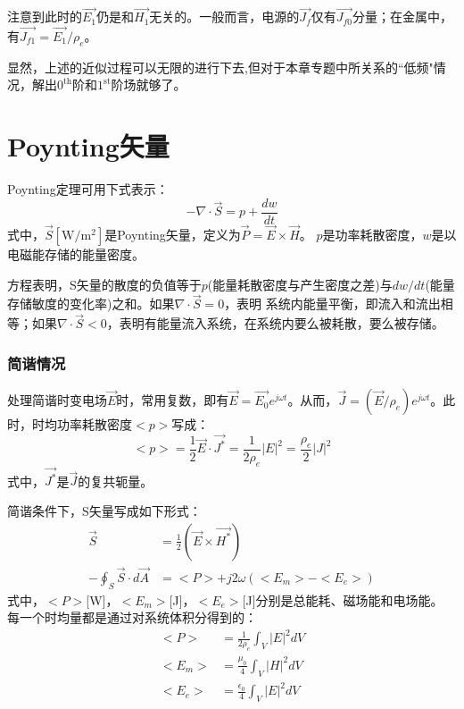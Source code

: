 注意到此时的$\vec{E_1}$仍是和$\vec{H_1}$无关的。一般而言，电源的$\vec{J_f}$仅有$\vec{J_{f0}}$分量；在金属中，有$\vec{J_{f1}}=\vec{E_1}/\rho_e$。

显然，上述的近似过程可以无限的进行下去,但对于本章专题中所关系的``低频"情况，解出$\mathrm{0^{th}}$阶和$\mathrm{1^{st}}$阶场就够了。

\section{Poynting矢量}
Poynting定理可用下式表示：
\begin{equation}\label{eqn:poynting}
-\nabla\cdot \vec{S}=p+\frac{dw}{dt}
\end{equation}
式中，$\vec{S}[\mathrm{W/m^2}]$是Poynting矢量，定义为$\vec{P}=\vec{E}\times \vec{H}$。
$p$是功率耗散密度，$w$是以电磁能存储的能量密度。

方程表明，S矢量的散度的负值等于$p$(能量耗散密度与产生密度之差)与$dw/dt$(能量存储敏度的变化率)之和。如果$\nabla \cdot \vec{S}=0$，表明
系统内能量平衡，即流入和流出相等；如果$\nabla \cdot \vec{S}<0$，表明有能量流入系统，在系统内要么被耗散，要么被存储。

\subsubsection{简谐情况}
处理简谐时变电场$\vec{E}$时，常用复数，即有$\vec{E}=\vec{E_0}e^{j\omega t}$。从而，$\vec{J}=(\vec{E}/\rho_e)e^{j\omega t}$。此时，时均功率耗散密度$<p>$写成：
\begin{equation}\label{eqn:poynting sincase}
  <p>=\frac{1}{2}\vec{E}\cdot \vec{J^*}=\frac{1}{2\rho_e}|E|^2=\frac{\rho_e}{2}|J|^2
\end{equation}
式中，$\vec{J^*}$是$\vec{J}$的复共轭量。

简谐条件下，S矢量写成如下形式：
\begin{subequations}\label{eqn:poynting s-vector sin}
	\begin{align}
\vec{S}&=\frac{1}{2}(\vec{E}\times \vec{H^*}) \\
-\oint_S \vec{S}\cdot d\vec{A}&=<P>+j2\omega (<E_m>-<E_e>)
	\end{align}
\end{subequations}
式中，$<P>$[W]，$<E_m>$[J]，$<E_e>$[J]分别是总能耗、磁场能和电场能。
每一个时均量都是通过对系统体积分得到的：
\begin{subequations}
	\begin{align}
<P>&= \frac{1}{2\rho_e}\int_V|E|^2dV\\
<E_m>&= \frac{\mu_0}{4}\int_V|H|^2dV \\
<E_e>&= \frac{\epsilon_0}{4}\int_V|E|^2dV
	\end{align}
\end{subequations}

